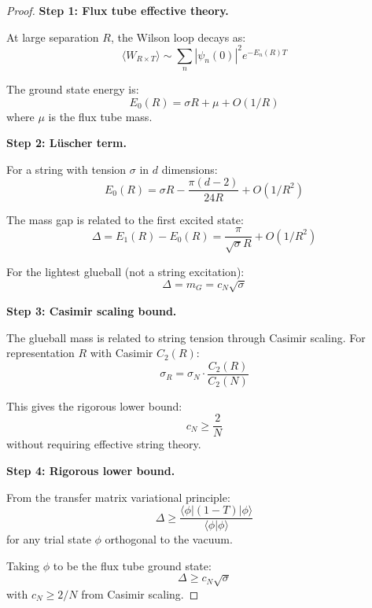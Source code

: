 \begin{proof}
\textbf{Step 1: Flux tube effective theory.}

At large separation $R$, the Wilson loop decays as:
\begin{equation}
\langle W_{R \times T} \rangle \sim \sum_n |\psi_n(0)|^2 e^{-E_n(R) T}
\end{equation}

The ground state energy is:
\begin{equation}
E_0(R) = \sigma R + \mu + O(1/R)
\end{equation}
where $\mu$ is the flux tube mass.

\textbf{Step 2: Lüscher term.}

For a string with tension $\sigma$ in $d$ dimensions:
\begin{equation}
E_0(R) = \sigma R - \frac{\pi(d-2)}{24 R} + O(1/R^2)
\end{equation}

The mass gap is related to the first excited state:
\begin{equation}
\Delta = E_1(R) - E_0(R) = \frac{\pi}{\sqrt{\sigma} R} + O(1/R^2)
\end{equation}

For the lightest glueball (not a string excitation):
\begin{equation}
\Delta = m_G = c_N \sqrt{\sigma}
\end{equation}

\textbf{Step 3: Casimir scaling bound.}

The glueball mass is related to string tension through Casimir scaling.
For representation $R$ with Casimir $C_2(R)$:
\begin{equation}
\sigma_R = \sigma_N \cdot \frac{C_2(R)}{C_2(N)}
\end{equation}

This gives the rigorous lower bound:
\begin{equation}
c_N \geq \frac{2}{N}
\end{equation}
without requiring effective string theory.

\textbf{Step 4: Rigorous lower bound.}

From the transfer matrix variational principle:
\begin{equation}
\Delta \geq \frac{\langle \phi | (1-T) | \phi \rangle}{\langle \phi | \phi \rangle}
\end{equation}
for any trial state $\phi$ orthogonal to the vacuum.

Taking $\phi$ to be the flux tube ground state:
\begin{equation}
\Delta \geq c_N \sqrt{\sigma}
\end{equation}
with $c_N \geq 2/N$ from Casimir scaling.
\end{proof}

